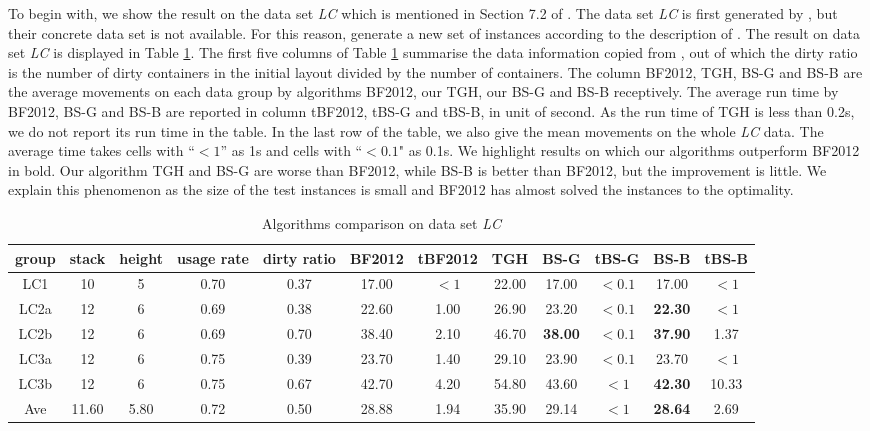 \documentclass[review,3p,times,authoryear,12pt]{elsarticle}
\begin{document}
To begin with, we show the result on the data set {\em LC} which is mentioned in Section 7.2 of \cite{BF2012}. The data set {\em LC} is first generated by \cite{Lee2009}, but their concrete data set is not available. For this reason, \cite{BF2012} generate a new set of instances according to the description of \cite{Lee2009}. The result on data set {\em LC} is displayed in Table \ref{tab:lc}. The first five columns of Table \ref{tab:lc} summarise the data information copied from \cite{BF2012}, out of which the dirty ratio is the number of dirty containers in the initial layout divided by the number of containers.
The column BF2012, TGH, BS-G and BS-B are the average movements on each data group by algorithms BF2012, our TGH, our BS-G and BS-B receptively. The average run time by BF2012, BS-G and BS-B are reported in column tBF2012, tBS-G and tBS-B, in unit of second. As the run time of TGH is less than 0.2s, we do not report its run time in the table. In the last row of the table, we also give the mean movements on the whole {\em LC} data. The average time takes cells with ``$<1$''  as 1s and cells with ``$<0.1$" as 0.1s. We highlight results on which our algorithms outperform BF2012 in bold. Our algorithm TGH and BS-G are worse than BF2012, while BS-B is better than BF2012, but the improvement is little. We explain this phenomenon as the size of the test instances is small and BF2012 has almost solved the instances to the optimality.
\begin{table}[htbp]
\begin{footnotesize}

  \caption{\label{tab:lc} Algorithms comparison on data set {\em LC}}
    \begin{tabular}{c|c|c|c|c|c|c|c|c|c|c|c}

    \hline
    group & stack & height & usage rate & dirty ratio & BF2012 & tBF2012 & TGH   & BS-G  & tBS-G & BS-B  & tBS-B \\
    \hline
    LC1   & 10  & 5  & 0.70  & 0.37  & 17.00  & $<1$  & 22.00  & 17.00  & $<0.1$  & 17.00  & $<1$ \\
    LC2a  & 12  & 6  & 0.69  & 0.38  & 22.60  & 1.00  & 26.90  & 23.20  & $<0.1$  & \textbf{22.30}  & $<1$ \\
    LC2b  & 12  & 6  & 0.69  & 0.70  & 38.40  & 2.10  & 46.70  & \textbf{38.00}  & $<0.1$  & \textbf{37.90}  & 1.37  \\
    LC3a  & 12  & 6  & 0.75  & 0.39  & 23.70  & 1.40  & 29.10  & 23.90  & $<0.1$  & 23.70  & $<1$ \\
    LC3b  & 12  & 6  & 0.75  & 0.67  & 42.70  & 4.20  & 54.80  & 43.60  & $<1$    & \textbf{42.30}  & 10.33  \\
    \hline
    Ave   & 11.60  & 5.80  & 0.72  & 0.50  & 28.88  & 1.94  & 35.90  & 29.14  & $<1$    & \textbf{28.64}  & 2.69  \\
    \hline
    \end{tabular}%
\end{footnotesize}
\end{table}%
\end{document}
